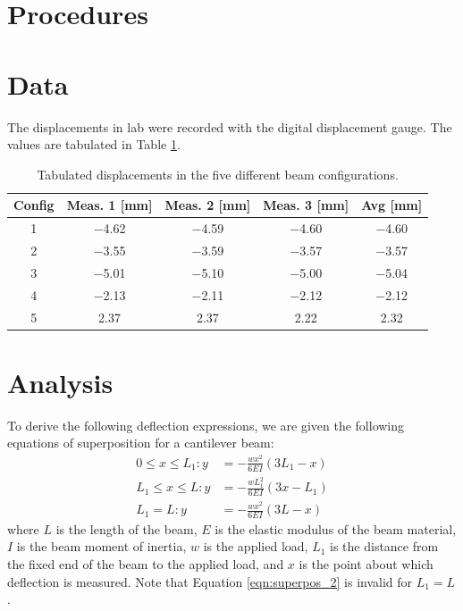 \documentclass[12 pt]{article}
\begin{document}
\section{Procedures} \label{procedures}


\section{Data} \label{data}
The displacements in lab were recorded with the digital displacement gauge. The values are tabulated in Table \ref{tbl:data}.

\begin{table}[!htbp]
\caption{Tabulated displacements in the five different beam configurations.}
\begin{center}
	\begin{tabular}{|c|c|c|c|c|}
		\hline
		Config&Meas. 1 [\unit{\mm}]&Meas. 2 [\unit{\mm}]&Meas. 3 [\unit{\mm}]&Avg [\unit{\mm}]\\
		\hline
		\num{1}&\num{-4.62}&\num{-4.59}&\num{-4.60}&\num{-4.60}\\
		\hline
		\num{2}&\num{-3.55}&\num{-3.59}&\num{-3.57}&\num{-3.57}\\
		\hline
		\num{3}&\num{-5.01}&\num{-5.10}&\num{-5.00}&\num{-5.04}\\
		\hline
		\num{4}&\num{-2.13}&\num{-2.11}&\num{-2.12}&\num{-2.12}\\
		\hline
		\num{5}&\num{2.37}&\num{2.37}&\num{2.22}&\num{2.32}\\
		\hline
	\end{tabular}
\end{center}
\label{tbl:data}
\end{table}

\section{Analysis} \label{analysis}
To derive the following deflection expressions, we are given the following equations of superposition for a cantilever beam:
\begin{align}
	0\le{}x\le{}L_1:y&=-\frac{wx^2}{6EI}(3L_1-x)\label{eqn:superpos_1}\\
	L_1\le{}x\le{}L:y&=-\frac{wL_1^2}{6EI}(3x-L_1)\label{eqn:superpos_2}\\
	L_1=L:y&=-\frac{wx^2}{6EI}(3L-x)\label{eqn:superpos_3}
\end{align}
where $L$ is the length of the beam, $E$ is the elastic modulus of the beam material, $I$ is the beam moment of inertia, $w$ is the applied load, $L_1$ is the distance from the fixed end of the beam to the applied load, and $x$ is the point about which deflection is measured. Note that Equation \ref{eqn:superpos_2} is invalid for $L_1=L$.
\end{document}
